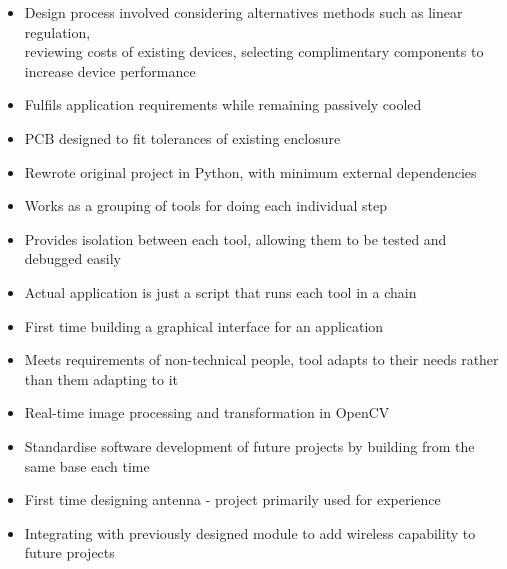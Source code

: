 {\begin{itemize}[noitemsep]
        \item{Design process involved considering alternatives methods such as linear regulation,\\
          reviewing costs of existing devices, selecting complimentary components to increase device performance}
        \item{Fulfils application requirements while remaining passively cooled}
        \item{PCB designed to fit tolerances of existing enclosure}
      \end{itemize}
      \vspace{-16.5pt}\begin{itemize}[noitemsep]
        \item{Rewrote original project in Python, with minimum external dependencies}
        \item{Works as a grouping of tools for doing each individual step}
        \item{Provides isolation between each tool, allowing them to be tested and debugged easily}
        \item{Actual application is just a script that runs each tool in a chain}
      \end{itemize}
      \vspace{-16.5pt}\begin{itemize}[noitemsep]
        \item{First time building a graphical interface for an application}
        \item{Meets requirements of non-technical people, tool adapts to their needs rather than them adapting to it}
        \item{Real-time image processing and transformation in OpenCV}
      \end{itemize}
      \vspace{-16.5pt}\begin{itemize}[noitemsep]
        \item{Standardise software development of future projects by building from the same base each time}
      \end{itemize}
      \vspace{-16.5pt}\begin{itemize}[noitemsep]
        \item{First time designing antenna - project primarily used for experience}
        \item{Integrating with previously designed module to add wireless capability to future projects}
      \end{itemize}
}
